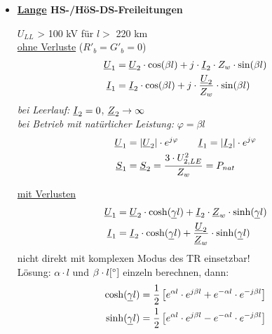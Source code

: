 \begin{itemize}
\item[] \textbf{\ul{Lange} HS-/HöS-DS-Freileitungen}

    $U_{LL}$ > 100 kV für $l>$ 220 km\\

    \ul{ohne Verluste} ($R'_b = G'_b = 0$)
    \begin{align*}
        \underline{U}_1 &= \underline{U}_2 \cdot \cos(\beta l) + j \cdot \underline{I}_2 \cdot Z_w \cdot \sin (\beta l)\\
        \underline{I}_1 &= \underline{I}_2 \cdot \cos(\beta l) + j \cdot \frac{\underline{U}_2}{Z_w} \cdot \sin (\beta l)
    \end{align*}
    \textit{bei Leerlauf:} $\underline{I}_2 = 0$, $\underline{Z}_2 \rightarrow \infty$\\
    \textit{bei Betrieb mit natürlicher Leistung:} $\varphi = \beta l$
    \begin{align*}
        \underline{U}_1 &= |\underline{U}_2| \cdot e^{j\varphi} \qquad
        \underline{I}_1 = |\underline{I}_2| \cdot e^{j\varphi}\\
        \underline{S}_1 &= \underline{S}_2 = \frac{3 \cdot U_{2,LE}^2}{Z_w} = P_{nat}
    \end{align*}

    \ul{mit Verlusten}
    \begin{align*}
        \underline{U}_1 &= \underline{U}_2 \cdot \cosh(\underline{\gamma} l) + \underline{I}_2 \cdot \underline{Z}_w \cdot \sinh(\underline{\gamma} l)\\
        \underline{I}_1 &= \underline{I}_2 \cdot \cosh(\underline{\gamma} l) + \frac{\underline{U}_2}{\underline{Z}_w}\cdot \sinh(\underline{\gamma} l)
    \end{align*}
    nicht direkt mit komplexen Modus des TR einsetzbar!\\
    Lösung: $\alpha \cdot l $ und $ \beta \cdot l [\degree]$ einzeln berechnen, dann:
    \begin{align*}
        \cosh(\underline{\gamma}l) &= \frac{1}{2} \left[e^{\alpha l} \cdot e^{j\beta l} + e^{-\alpha l} \cdot e^{-j\beta l} \right]\\
        \sinh (\underline{\gamma}l)&= \frac{1}{2} \left[e^{\alpha l} \cdot e^{j\beta l} - e^{-\alpha l} \cdot e^{-j\beta l} \right]\\
    \end{align*}


\end{itemize}
